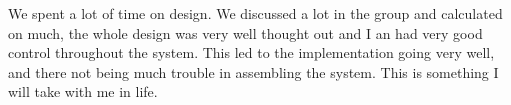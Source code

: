  We spent a lot of time on design. We discussed a lot in the group and calculated on much, the whole design was very well thought out and I an had very good control throughout the system. This led to the implementation going very well, and there not being much trouble in assembling the system. This is something I will take with me in life.
